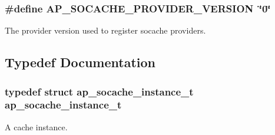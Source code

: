 \subsubsection[{\texorpdfstring{A\+P\+\_\+\+S\+O\+C\+A\+C\+H\+E\+\_\+\+P\+R\+O\+V\+I\+D\+E\+R\+\_\+\+V\+E\+R\+S\+I\+ON}{AP_SOCACHE_PROVIDER_VERSION}}]{\setlength{\rightskip}{0pt plus 5cm}\#define A\+P\+\_\+\+S\+O\+C\+A\+C\+H\+E\+\_\+\+P\+R\+O\+V\+I\+D\+E\+R\+\_\+\+V\+E\+R\+S\+I\+ON~\char`\"{}0\char`\"{}}\hypertarget{group__AP__SOCACHE_gac8fa414096ef7bb571ddb30611c8824a}{}\label{group__AP__SOCACHE_gac8fa414096ef7bb571ddb30611c8824a}
The provider version used to register socache providers. 

\subsection{Typedef Documentation}
\subsubsection[{\texorpdfstring{ap\+\_\+socache\+\_\+instance\+\_\+t}{ap_socache_instance_t}}]{\setlength{\rightskip}{0pt plus 5cm}typedef struct {\bf ap\+\_\+socache\+\_\+instance\+\_\+t} {\bf ap\+\_\+socache\+\_\+instance\+\_\+t}}\hypertarget{group__AP__SOCACHE_ga6a099ea28b105424f91cff09d2017acf}{}\label{group__AP__SOCACHE_ga6a099ea28b105424f91cff09d2017acf}
A cache instance. 

